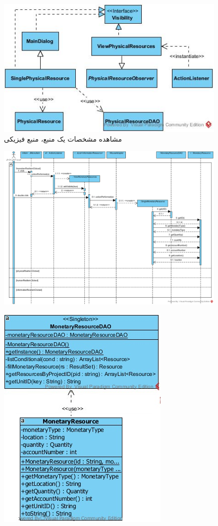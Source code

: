 \begin{landscape}
\begin{figure}[H]
	\includegraphics[scale=0.6]{img/sequence-design/ViewResourceAttributes_PHYSICALUI}
	\caption{مشاهده مشخصات یک منبع، منبع فیزیکی}
\end{figure}
\begin{figure}[H]
	\centering
	\includegraphics[scale=0.8]{img/sequence-design/ViewResourceAttributes_MONETARY}
\end{figure}
\begin{figure}[H]
	\centering
	\includegraphics[scale=0.6]{img/sequence-design/ViewResourceAttributes_MONETARYC}

\end{figure}
\end{landscape}
